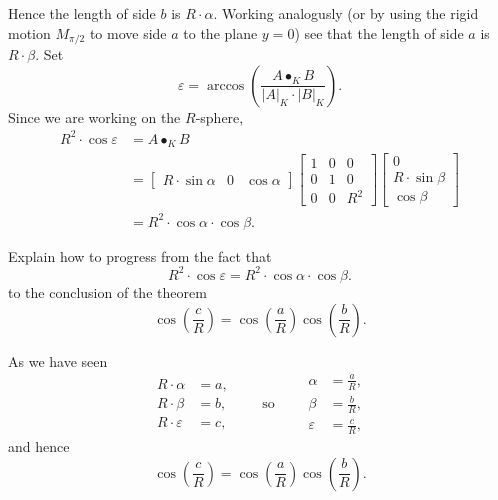 \documentclass[newpage,hints,handout,noauthor,nooutcomes,12pt]{ximera}
\begin{document}
Hence the length of side $b$ is $R\cdot\alpha$. Working analogusly (or
by using the rigid motion $M_{\pi/2}$ to move side $a$ to the plane
$y=0$) see that the length of side $a$ is $R\cdot \beta$. Set
\[
\varepsilon = \arccos\left(\frac{A\bullet_K B}{|A|_K\cdot |B|_K}\right).
\]
Since we are working on the $R$-sphere,
\begin{align*}
  R^2\cdot \cos \varepsilon &= A\bullet_K B\\
  &=
  \begin{bmatrix}
    R\cdot \sin\alpha &  0 & \cos\alpha
  \end{bmatrix}
    \begin{bmatrix}
      1 & 0 & 0\\
      0 & 1 & 0\\
      0 & 0 & R^2
    \end{bmatrix}
    \begin{bmatrix}
      0\\
      R\cdot\sin\beta\\
      \cos\beta
    \end{bmatrix}\\
   &=R^2 \cdot \cos\alpha \cdot \cos\beta.
\end{align*}


\begin{problem}
  Explain how to progress from the fact that
  \[
  R^2\cdot \cos \varepsilon = R^2 \cdot \cos\alpha \cdot \cos\beta.
  \]
  to the conclusion of the theorem
  \[
  \cos\left(\frac{c}{R}\right)=\cos\left(\frac{a}{R}\right)\cos\left(\frac{b}{R}\right).
  \]
  \begin{freeResponse}
    As we have seen
    \[
    \begin{split}
      R\cdot \alpha &= a,\\
      R\cdot \beta  &= b,\\
      R\cdot \varepsilon &= c,
    \end{split}
    \qquad\text{so}\qquad
    \begin{split}
      \alpha &= \frac{a}{R},\\
      \beta  &= \frac{b}{R},\\
      \varepsilon &= \frac{c}{R},
    \end{split}
    \]
    and hence
    \[
    \cos\left(\frac{c}{R}\right)=\cos\left(\frac{a}{R}\right)\cos\left(\frac{b}{R}\right).
    \]
  \end{freeResponse}
\end{problem}
\end{document}
